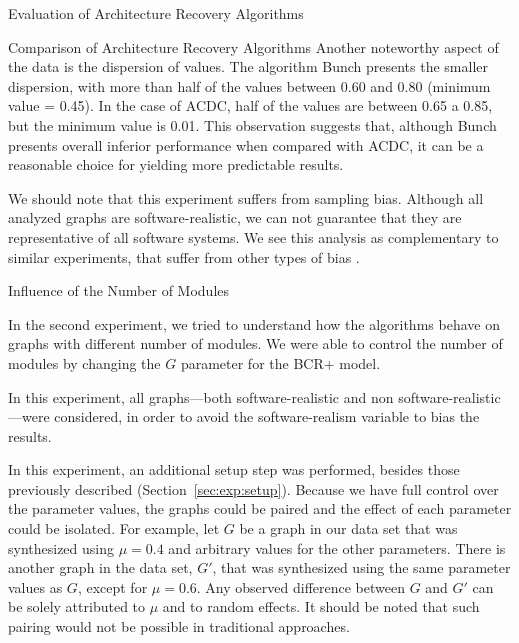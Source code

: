 \documentclass[11pt,twocolumn,a4paper,english]{article}
\newcommand{\TODO}{\textbf{TODO:} }
\begin{document}
\begin{section}{Evaluation of Architecture Recovery Algorithms}
\begin{subsection}{Comparison of Architecture Recovery Algorithms}
	Another noteworthy aspect of the data is the dispersion of values. The algorithm Bunch presents the smaller dispersion, with more than half of the values between 0.60 and 0.80 (minimum value = 0.45). In the case of ACDC, half of the values are between 0.65 a 0.85, but the minimum value is 0.01. This observation suggests that, although Bunch presents overall inferior performance when compared with ACDC, it can be a reasonable choice for yielding more predictable results.
	
	We should note that this experiment suffers from sampling bias. Although all analyzed graphs are software-realistic, we can not guarantee that they are representative of all software systems. We see this analysis as complementary to similar experiments, that suffer from other types of bias \cite{Wu2005,Bittencourt2009,Andritsos2005}.
	
\end{subsection}	

\begin{subsection}{Influence of the Number of Modules} \label{sec:exp2}
	
	In the second experiment, we tried to understand how the algorithms behave on graphs with different number of modules. We were able to control the number of modules by changing the $G$ parameter for the BCR+ model.
	
	In this experiment, all graphs---both software-realistic and non software-realistic---were considered, in order to avoid the software-realism variable to bias the results.

In this experiment, an additional setup step was performed, besides those previously described (Section~\ref{sec:exp:setup}).
Because we have full control over the parameter values, the graphs could be paired and the effect of each parameter could be isolated. For example, let $G$ be a graph in our data set that was synthesized using $\mu = 0.4$ and arbitrary values for the other parameters. There is another graph in the data set, $G\prime$, that was synthesized using the same parameter values as $G$, except for $\mu = 0.6$. Any observed difference between $G$ and $G\prime$ can be solely attributed to $\mu$ and to random effects. It should be noted that such pairing would not be possible in traditional approaches.
		

\end{subsection}
\end{section}
\end{document}
